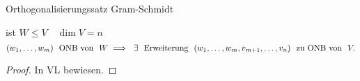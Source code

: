 \documentclass[class=article, crop=false]{standalone}
\begin{document}
\begin{zettel}{Orthogonalisierungssatz Gram-Schmidt}
\begin{flashcard}[]{}
	\begin{theorem}
		ist $W \leq V \quad \dim V = n$
		\[
			(w_1,\dots, w_m)  \tx{ ONB von } W \implies \exists \tx{ Erweiterung } (w_1, \dots, w_m, v_{m+1}, \dots , v_n ) \tx{ zu ONB von } V
		.\]
	\end{theorem}
\end{flashcard}

\begin{proof}
	In VL bewiesen.
\end{proof}
\end{zettel}
\end{document}
